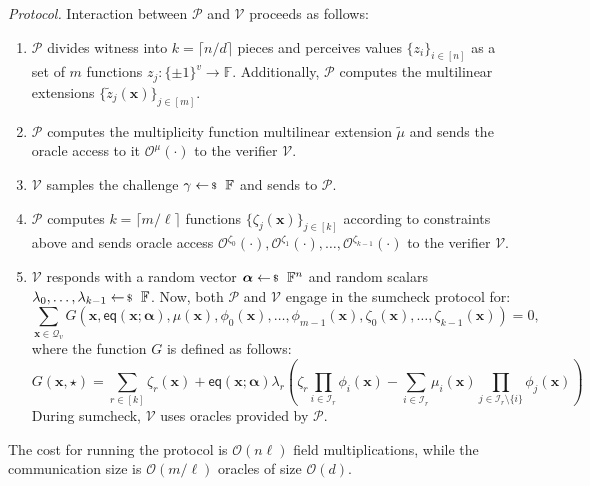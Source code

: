 \textit{Protocol.} Interaction between $\mathcal{P}$ and $\mathcal{V}$ proceeds as follows:
\begin{enumerate}
    \item $\mathcal{P}$ divides witness into $k = \lceil n/d \rceil$ pieces and
    perceives values $\{z_i\}_{i \in [n]}$ as a set of $m$ functions $z_j:
    \{\pm 1\}^v \to \mathbb{F}$. Additionally, $\mathcal{P}$ computes the
    multilinear extensions $\{\widetilde{z}_j(\mathbf{x})\}_{j \in [m]}$.
    \item $\mathcal{P}$ computes the multiplicity function multilinear extension
    $\widetilde{\mu}$ and sends the oracle access to it
    $\mathcal{O}^{\mu}(\cdot)$ to the verifier $\mathcal{V}$.
    \item $\mathcal{V}$ samples the challenge $\gamma \leftarrowS \mathbb{F}$
    and sends to $\mathcal{P}$.
    \item $\mathcal{P}$ computes $k=\lceil m/\ell \rceil$ functions
    $\{\zeta_j(\mathbf{x})\}_{j \in [k]}$ according to constraints above and
    sends oracle access
    $\mathcal{O}^{\zeta_0}(\cdot),\mathcal{O}^{\zeta_1}(\cdot),\dots,\mathcal{O}^{\zeta_{k-1}}(\cdot)$
    to the verifier $\mathcal{V}$.
    \item $\mathcal{V}$ responds with a random vector $\boldsymbol{\alpha} \leftarrowS \mathbb{F}^n$ and 
    random scalars $\lambda_0,\dots,\lambda_{k-1} \leftarrowS \mathbb{F}$. Now, both $\mathcal{P}$ and 
    $\mathcal{V}$ engage in the sumcheck protocol for:
    \begin{equation*}
        \sum_{\mathbf{x} \in \mathcal{Q}_v}G(\mathbf{x}, \mathsf{eq}(\mathbf{x};\boldsymbol{\alpha}),\mu(\mathbf{x}),\phi_0(\mathbf{x}),\dots,\phi_{m-1}(\mathbf{x}),\zeta_0(\mathbf{x}),\dots,\zeta_{k-1}(\mathbf{x})) = 0,
    \end{equation*}
    where the function $G$ is defined as follows:
    \begin{equation*}
        G(\mathbf{x},\star) = \sum_{r \in [k]} \zeta_r(\mathbf{x}) + \mathsf{eq}(\mathbf{x};\boldsymbol{\alpha})\lambda_r\left(\zeta_r\prod_{i \in \mathcal{I}_r}\phi_i(\mathbf{x}) - \sum_{i \in \mathcal{I}_r}\mu_i(\mathbf{x})\prod_{j \in \mathcal{I}_r \setminus \{i\}} \phi_j(\mathbf{x})\right)
    \end{equation*}
    During sumcheck, $\mathcal{V}$ uses oracles provided by $\mathcal{P}$.
\end{enumerate}

\begin{lemma}
    The cost for running the protocol is $\mathcal{O}(n \ell)$
    field multiplications, while the communication size is $\mathcal{O}(m/\ell)$ oracles of size
    $\mathcal{O}(d)$.
\end{lemma}

